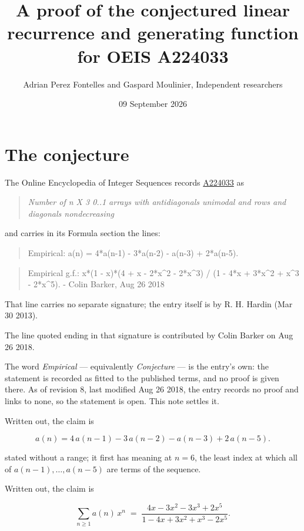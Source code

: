 \documentclass[11pt]{article}
\title{A proof of the conjectured linear recurrence and generating function for OEIS A224033}
\author{Adrian Perez Fontelles and Gaspard Moulinier, Independent researchers}
\date{09 September 2026}
\theoremstyle{definition}
\begin{document}
\maketitle
\section{The conjecture}

The Online Encyclopedia of Integer Sequences records \href{https://oeis.org/A224033}{A224033} as

\begin{quote}\itshape Number of n X 3 0..1 arrays with antidiagonals unimodal and rows and diagonals nondecreasing\end{quote}

and carries in its Formula section the lines:

\begin{quote}\ttfamily Empirical: a(n) = 4*a(n-1) - 3*a(n-2) - a(n-3) + 2*a(n-5).\end{quote}

\begin{quote}\ttfamily Empirical g.f.: x*(1 - x)*(4 + x - 2*x\textasciicircum{}2 - 2*x\textasciicircum{}3) / (1 - 4*x + 3*x\textasciicircum{}2 + x\textasciicircum{}3 - 2*x\textasciicircum{}5). - Colin Barker, Aug 26 2018\end{quote}

That line carries no separate signature; the entry itself is by R. H. Hardin (Mar 30 2013).

The line quoted ending in that signature is contributed by Colin Barker on Aug 26 2018.

The word {\itshape Empirical} --- equivalently {\itshape Conjecture} --- is the entry's own: the statement is recorded as fitted to the published terms, and no proof is given there. As of revision 8, last modified Aug 26 2018, the entry records no proof and links to none, so the statement is open. This note settles it.

Written out, the claim is

\[a(n) = 4\,a(n-1) - 3\,a(n-2) - a(n-3) + 2\,a(n-5).\]

stated without a range; it first has meaning at $n = 6$, the least index at which all of $a(n-1),\dots,a(n-5)$ are terms of the sequence.

Written out, the claim is

\[\sum_{n \ge 1} a(n)\,x^n \;=\; \frac{4x - 3x^{2} - 3x^{3} + 2x^{5}}{1 - 4x + 3x^{2} + x^{3} - 2x^{5}}.\]
\end{document}
